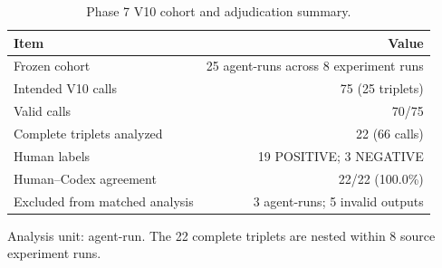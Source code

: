 \begin{table}[t]
\centering
\caption{Phase 7 V10 cohort and adjudication summary.}
\label{tab:phase7-v10-cohort}
\begin{tabular}{lr}
\toprule
Item & Value \\
\midrule
Frozen cohort & 25 agent-runs across 8 experiment runs \\
Intended V10 calls & 75 (25 triplets) \\
Valid calls & 70/75 \\
Complete triplets analyzed & 22 (66 calls) \\
Human labels & 19 POSITIVE; 3 NEGATIVE \\
Human--Codex agreement & 22/22 (100.0\%) \\
Excluded from matched analysis & 3 agent-runs; 5 invalid outputs \\
\bottomrule
\end{tabular}
\vspace{2pt}
\footnotesize Analysis unit: agent-run. The 22 complete triplets are nested within 8 source experiment runs.
\end{table}
